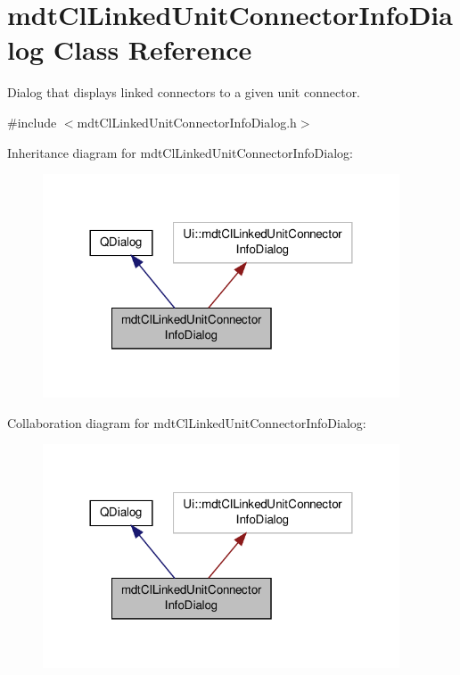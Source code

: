 \hypertarget{classmdt_cl_linked_unit_connector_info_dialog}{\section{mdt\-Cl\-Linked\-Unit\-Connector\-Info\-Dialog Class Reference}
\label{classmdt_cl_linked_unit_connector_info_dialog}
}


Dialog that displays linked connectors to a given unit connector.  




{\ttfamily \#include $<$mdt\-Cl\-Linked\-Unit\-Connector\-Info\-Dialog.\-h$>$}



Inheritance diagram for mdt\-Cl\-Linked\-Unit\-Connector\-Info\-Dialog\-:\nopagebreak
\begin{figure}[H]
\begin{center}
\leavevmode
\includegraphics[width=300pt]{classmdt_cl_linked_unit_connector_info_dialog__inherit__graph}
\end{center}
\end{figure}


Collaboration diagram for mdt\-Cl\-Linked\-Unit\-Connector\-Info\-Dialog\-:\nopagebreak
\begin{figure}[H]
\begin{center}
\leavevmode
\includegraphics[width=300pt]{classmdt_cl_linked_unit_connector_info_dialog__coll__graph}
\end{center}
\end{figure}
